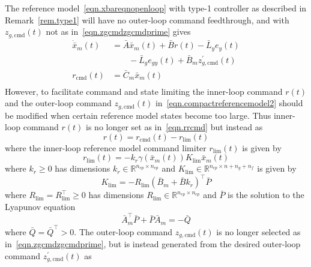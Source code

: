 \documentclass[journal]{IEEEtran}
\theoremstyle{innercustomthm}
\begin{document}
  The reference model\ \eqref{eqn.xbareqnopenloop} with type-1 controller as described in Remark~\ref{rem.type1} will have no outer-loop command feedthrough, and with $z_{g,\text{cmd}}(t)$ not as in\ \eqref{eqn.zgcmdzgcmdprime} gives
  \begin{equation}
    \label{eqn.compactreferencemodel2}
    \begin{split}
      \dot{\bar{x}}_{m}(t)
      &=
      \bar{A}\bar{x}_{m}(t) + \bar{B}r(t) - \bar{L}_{y}e_{y}(t) \\
      & \qquad
      - \bar{L}_{g}e_{gy}(t) + \bar{B}_{m}z_{g,\text{cmd}}^{\prime}(t) \\
      r_{\text{cmd}}(t)
      &=
      \bar{C}_{m}\bar{x}_{m}(t) \\
    \end{split}
  \end{equation}
  However, to facilitate command and state limiting the inner-loop command $r(t)$ and the outer-loop command $z_{g,\text{cmd}}(t)$ in\ \eqref{eqn.compactreferencemodel2} should be modified when certain reference model states become too large.
  Thus inner-loop command $r(t)$ is no longer set as in\ \eqref{eqn.rrcmd} but instead as
  \begin{equation}
    \label{eqn.rrcmdrlim}
    r(t) = r_{\text{cmd}}(t) - r_{\text{lim}}(t)
  \end{equation}
  where the inner-loop reference model command limiter $r_{\text{lim}}(t)$ is given by
  \begin{equation}
    \label{eqn.rlim}
    r_{\text{lim}}(t) = -k_{r}\gamma(\bar{x}_{m}(t)) K_{\text{lim}}\bar{x}_{m}(t)
  \end{equation}
  where $k_{r}\geq0$ has dimensions $k_{r}\in\mathbb{R}^{n_{ep}\times n_{ep}}$ and $K_{\text{lim}}\in\mathbb{R}^{n_{ep}\times n+n_{g}+n_{f}}$ is given by
  \begin{equation}
    \label{eqn.Klim}
    K_{\text{lim}} = - R_{\text{lim}}(\bar{B}_{m}+\bar{B}k_{r})^{\top}\bar{P}
  \end{equation}
  where $R_{\text{lim}} = R_{\text{lim}}^{\top}\geq0$ has dimensions $R_{\text{lim}}\in\mathbb{R}^{n_{ep}\times n_{ep}}$ and $\bar{P}$ is the solution to the Lyapunov equation
  \begin{equation}
    \label{eqn.LyapEqnPbar}
    \bar{A}_{m}^{\top}\bar{P}+\bar{P}\bar{A}_{m} = -\bar{Q}
  \end{equation}
  where $\bar{Q}=\bar{Q}^{\top}>0$.
  The outer-loop command $z_{g,\text{cmd}}(t)$ is no longer selected as in\ \eqref{eqn.zgcmdzgcmdprime}, but is instead generated from the desired outer-loop command $z_{g,\text{cmd}}^{\prime}(t)$ as
\end{document}
